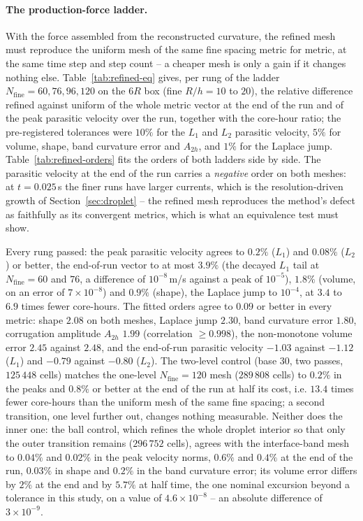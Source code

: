 \documentclass[preprint,3p,11pt]{elsarticle}
\begin{document}
\paragraph{The production-force ladder.}
With the force assembled from the reconstructed curvature, the refined mesh must reproduce
the uniform mesh of the same fine spacing metric for metric, at the same time step and step
count -- a cheaper mesh is only a gain if it changes nothing else. Table~\ref{tab:refined-eq}
gives, per rung of the ladder $N_{\mathrm{fine}}=60,76,96,120$ on the $6R$ box (fine
$R/h=10$ to $20$), the relative difference refined against uniform of the whole metric
vector at the end of the run and of the peak parasitic velocity over the run, together with
the core-hour ratio; the pre-registered tolerances were $10\%$ for the $L_1$ and $L_2$
parasitic velocity, $5\%$ for volume, shape, band curvature error and $A_{2h}$, and $1\%$
for the Laplace jump. Table~\ref{tab:refined-orders} fits the orders of both ladders side by
side. The parasitic velocity at the end of the run carries a \emph{negative} order on both
meshes: at $t=0.025$\,s the finer runs have larger currents, which is the resolution-driven
growth of Section~\ref{sec:droplet} -- the refined mesh reproduces the method's defect as
faithfully as its convergent metrics, which is what an equivalence test must show.

Every rung passed: the peak parasitic velocity agrees to $0.2\%$ ($L_1$) and $0.08\%$
($L_2$) or better, the end-of-run vector to at most $3.9\%$ (the decayed $L_1$ tail at
$N_{\mathrm{fine}}=60$ and $76$, a difference of $10^{-8}$\,m/s against a peak of
$10^{-5}$), $1.8\%$ (volume, on an error of $7\times10^{-8}$) and $0.9\%$ (shape), the
Laplace jump to $10^{-4}$, at $3.4$ to $6.9$ times fewer core-hours. The fitted orders agree
to $0.09$ or better in every metric: shape $2.08$ on both meshes, Laplace jump $2.30$, band
curvature error $1.80$, corrugation amplitude $A_{2h}$ $1.99$ (correlation $\ge0.998$),
the non-monotone volume error $2.45$ against $2.48$, and the end-of-run parasitic velocity
$-1.03$ against $-1.12$ ($L_1$) and $-0.79$ against $-0.80$ ($L_2$). The two-level control
(base $30$, two passes, $125\,448$ cells) matches the one-level $N_{\mathrm{fine}}=120$
mesh ($289\,808$ cells) to $0.2\%$ in the peaks and $0.8\%$ or better at the end of the
run at half its cost, i.e. $13.4$ times fewer core-hours than the uniform mesh of the same
fine spacing; a second transition, one level further out, changes nothing measurable.
Neither does the inner one: the ball control, which refines the whole droplet interior so
that only the outer transition remains ($296\,752$ cells), agrees with the interface-band
mesh to $0.04\%$ and $0.02\%$ in the peak velocity norms, $0.6\%$ and $0.4\%$ at the end
of the run, $0.03\%$ in shape and $0.2\%$ in the band curvature error; its volume error
differs by $2\%$ at the end and by $5.7\%$ at half time, the one nominal excursion beyond a
tolerance in this study, on a value of $4.6\times10^{-8}$ -- an absolute difference of
$3\times10^{-9}$.
\end{document}
